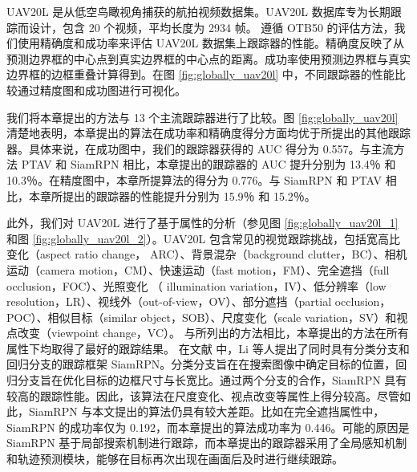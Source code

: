 UAV20L \cite{mueller2016benchmark} 是从低空鸟瞰视角捕获的航拍视频数据集。UAV20L 数据库专为长期跟踪而设计，包含 20 个视频，平均长度为 2934 帧。
遵循 OTB50 \cite{OTB} 的评估方法，我们使用精确度和成功率来评估 UAV20L 数据集上跟踪器的性能。精确度反映了从预测边界框的中心点到真实边界框的中心点的距离。成功率使用预测边界框与真实边界框的边框重叠计算得到。在图 \ref{fig:globally_uav20l} 中，不同跟踪器的性能比较通过精度图和成功图进行可视化。

我们将本章提出的方法与 13 个主流跟踪器进行了比较。图 \ref{fig:globally_uav20l} 清楚地表明，本章提出的算法在成功率和精确度得分方面均优于所提出的其他跟踪器。具体来说，在成功图中，我们的跟踪器获得的 AUC 得分为 0.557。与主流方法 PTAV \cite{fan2018parallel} 和 SiamRPN \cite{SiamRPN} 相比，本章提出的跟踪器的 AUC 提升分别为 13.4％ 和 10.3％。在精度图中，本章所提算法的得分为 0.776。与 SiamRPN \cite{SiamRPN} 和 PTAV \cite{fan2018parallel} 相比，本章所提出的跟踪器的性能提升分别为 15.9％ 和 15.2％。

此外，我们对 UAV20L 进行了基于属性的分析（参见图 \ref{fig:globally_uav20l_1} 和图 \ref{fig:globally_uav20l_2}）。UAV20L 包含常见的视觉跟踪挑战，包括宽高比变化（aspect ratio change，
ARC）、背景混杂（background clutter，BC）、相机运动（camera motion，CM）、快速运动（fast motion，FM）、完全遮挡（full occlusion，FOC）、光照变化
（
illumination variation，IV）、低分辨率（low resolution，LR）、视线外（out-of-view，OV）、部分遮挡（partial occlusion，POC）、相似目标（similar object，SOB）、尺度变化（scale variation，SV）和视点改变（viewpoint change，VC）。
与所列出的方法相比，本章提出的方法在所有属性下均取得了最好的跟踪结果。
在文献 \cite{SiamRPN} 中，Li 等人提出了同时具有分类分支和回归分支的跟踪框架 SiamRPN。分类分支旨在在搜索图像中确定目标的位置，回归分支旨在优化目标的边框尺寸与长宽比。通过两个分支的合作，SiamRPN 具有较高的跟踪性能。因此，该算法在尺度变化、视点改变等属性上得分较高。尽管如此，SiamRPN 与本文提出的算法仍具有较大差距。比如在完全遮挡属性中，SiamRPN 的成功率仅为 0.192，而本章提出的算法成功率为 0.446。可能的原因是 SiamRPN 基于局部搜索机制进行跟踪，而本章提出的跟踪器采用了全局感知机制和轨迹预测模块，能够在目标再次出现在画面后及时进行继续跟踪。

